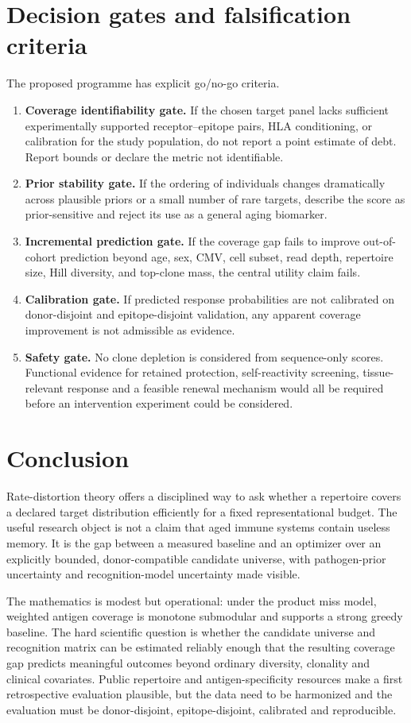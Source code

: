 \documentclass[11pt]{article}
\begin{document}
\section{Decision gates and falsification criteria}
The proposed programme has explicit go/no-go criteria.
\begin{enumerate}
\item \textbf{Coverage identifiability gate.} If the chosen target panel lacks sufficient experimentally supported receptor--epitope pairs, HLA conditioning, or calibration for the study population, do not report a point estimate of debt. Report bounds or declare the metric not identifiable.
\item \textbf{Prior stability gate.} If the ordering of individuals changes dramatically across plausible priors or a small number of rare targets, describe the score as prior-sensitive and reject its use as a general aging biomarker.
\item \textbf{Incremental prediction gate.} If the coverage gap fails to improve out-of-cohort prediction beyond age, sex, CMV, cell subset, read depth, repertoire size, Hill diversity, and top-clone mass, the central utility claim fails.
\item \textbf{Calibration gate.} If predicted response probabilities are not calibrated on donor-disjoint and epitope-disjoint validation, any apparent coverage improvement is not admissible as evidence.
\item \textbf{Safety gate.} No clone depletion is considered from sequence-only scores. Functional evidence for retained protection, self-reactivity screening, tissue-relevant response and a feasible renewal mechanism would all be required before an intervention experiment could be considered.
\end{enumerate}

\section{Conclusion}
Rate-distortion theory offers a disciplined way to ask whether a repertoire covers a declared target distribution efficiently for a fixed representational budget. The useful research object is not a claim that aged immune systems contain useless memory. It is the gap between a measured baseline and an optimizer over an explicitly bounded, donor-compatible candidate universe, with pathogen-prior uncertainty and recognition-model uncertainty made visible.

The mathematics is modest but operational: under the product miss model, weighted antigen coverage is monotone submodular and supports a strong greedy baseline. The hard scientific question is whether the candidate universe and recognition matrix can be estimated reliably enough that the resulting coverage gap predicts meaningful outcomes beyond ordinary diversity, clonality and clinical covariates. Public repertoire and antigen-specificity resources make a first retrospective evaluation plausible, but the data need to be harmonized and the evaluation must be donor-disjoint, epitope-disjoint, calibrated and reproducible.
\end{document}
